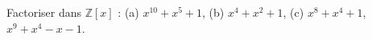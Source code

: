 Factoriser dans $\mathbb{Z}[x]$ : (a) $x^{10} + x^5 + 1$, (b) $x^4 + x^2 + 1$, (c) $x^8 + x^4 + 1$, $x^9 + x^4 - x - 1$.
